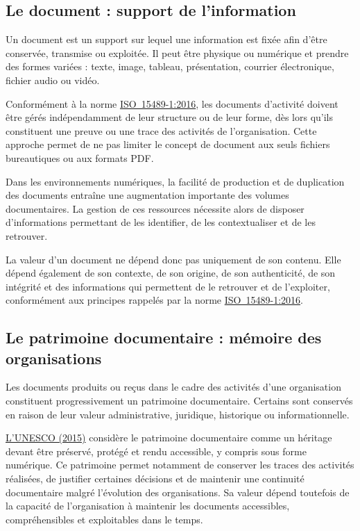 \documentclass[12pt,a4paper]{report}
\newcommand{\citer}[2]{\hyperref[ref:#1]{#2}}
\begin{document}
\subsection{Le document : support de l'information}
Un document est un support sur lequel une information est fixée afin d'être conservée, transmise ou exploitée. Il peut être physique ou numérique et prendre des formes variées : texte, image, tableau, présentation, courrier électronique, fichier audio ou vidéo.

Conformément à la norme \citer{iso15489}{\mbox{ISO 15489-1:2016}}, les documents d'activité doivent être gérés indépendamment de leur structure ou de leur forme, dès lors qu'ils constituent une preuve ou une trace des activités de l'organisation. Cette approche permet de ne pas limiter le concept de document aux seuls fichiers bureautiques ou aux formats PDF.

Dans les environnements numériques, la facilité de production et de duplication des documents entraîne une augmentation importante des volumes documentaires. La gestion de ces ressources nécessite alors de disposer d'informations permettant de les identifier, de les contextualiser et de les retrouver.

La valeur d'un document ne dépend donc pas uniquement de son contenu. Elle dépend également de son contexte, de son origine, de son authenticité, de son intégrité et des informations qui permettent de le retrouver et de l'exploiter, conformément aux principes rappelés par la norme \citer{iso15489}{\mbox{ISO 15489-1:2016}}.

\subsection{Le patrimoine documentaire : mémoire des organisations}
Les documents produits ou reçus dans le cadre des activités d'une organisation constituent progressivement un patrimoine documentaire. Certains sont conservés en raison de leur valeur administrative, juridique, historique ou informationnelle.

\citer{unesco2015}{L'UNESCO (2015)} considère le patrimoine documentaire comme un héritage devant être préservé, protégé et rendu accessible, y compris sous forme numérique. Ce patrimoine permet notamment de conserver les traces des activités réalisées, de justifier certaines décisions et de maintenir une continuité documentaire malgré l'évolution des organisations. Sa valeur dépend toutefois de la capacité de l'organisation à maintenir les documents accessibles, compréhensibles et exploitables dans le temps.
\end{document}
